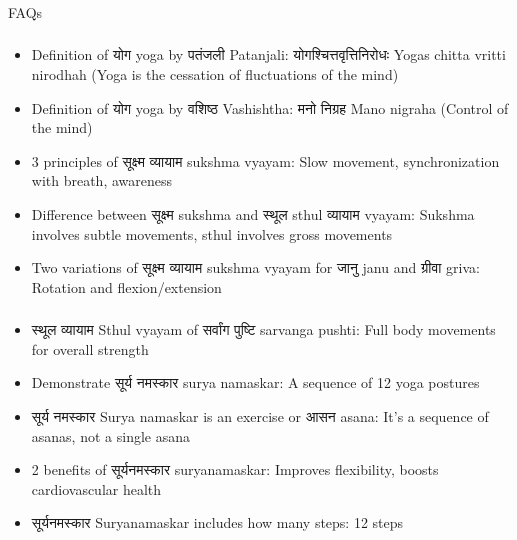 \begin{frame}[fragile]\frametitle{}
\begin{center}
{\Large FAQs}
\end{center}
\end{frame}

\begin{frame}[fragile]\frametitle{}
\begin{itemize}
\item Definition of योग yoga by पतंजली Patanjali: योगश्चित्तवृत्तिनिरोधः Yogas chitta vritti nirodhah (Yoga is the cessation of fluctuations of the mind)
\item Definition of योग  yoga by वशिष्ठ  Vashishtha: मनो निग्रह Mano nigraha (Control of the mind)
\item 3 principles of सूक्ष्म व्यायाम sukshma vyayam: Slow movement, synchronization with breath, awareness
\item Difference between सूक्ष्म sukshma and स्थूल sthul व्यायाम vyayam: Sukshma involves subtle movements, sthul involves gross movements
\item Two variations of सूक्ष्म व्यायाम sukshma vyayam for जानु janu and ग्रीवा griva: Rotation and flexion/extension
\end{itemize}
\end{frame}

\begin{frame}[fragile]\frametitle{}
\begin{itemize}
\item स्थूल व्यायाम Sthul vyayam of सर्वांग पुष्टि sarvanga pushti: Full body movements for overall strength
\item Demonstrate सूर्य नमस्कार surya namaskar: A sequence of 12 yoga postures
\item सूर्य नमस्कार Surya namaskar is an exercise or आसन asana: It's a sequence of asanas, not a single asana
\item 2 benefits of सूर्यनमस्कार suryanamaskar: Improves flexibility, boosts cardiovascular health
\item सूर्यनमस्कार Suryanamaskar includes how many steps: 12 steps
\end{itemize}
\end{frame}

